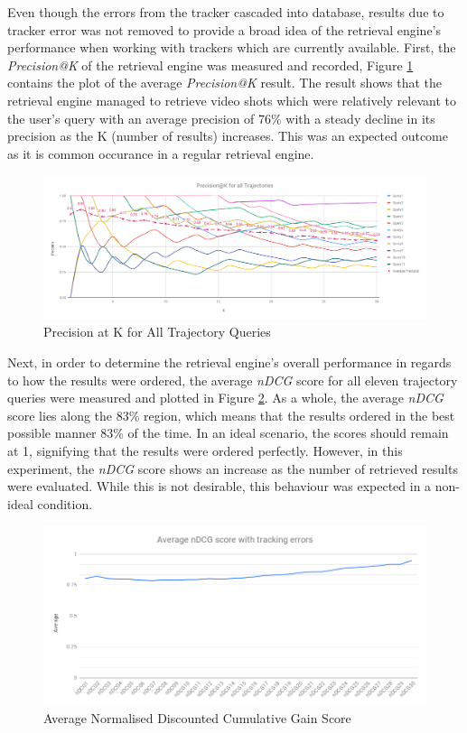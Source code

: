 Even though the errors from the tracker\cite{lim2017} cascaded into database,
results due to tracker error was not removed to provide a broad idea of the
retrieval engine's performance when working with trackers which are currently
available. First, the \textit{Precision@K} of the retrieval engine was measured
and recorded, Figure \ref{fig:versionTwoPreAtK} contains the plot of the
average \textit{Precision@K} result. The result shows that the retrieval engine
managed to retrieve video shots which were relatively relevant to the user's
query with an average precision of 76\% with a steady decline in its precision
as the K (number of results) increases. This was an expected outcome as it is
common occurance in a regular retrieval engine.

\begin{figure}[!ht]
  \centering
    \includegraphics[width=\linewidth]{image/retrievalTwo/p@k.png}
  \caption{Precision at K for All Trajectory Queries}
  \label{fig:versionTwoPreAtK}
\end{figure}

Next, in order to determine the retrieval engine's overall performance in
regards to how the results were ordered, the average \textit{nDCG} score for
all eleven trajectory queries were measured and plotted in Figure
\ref{fig:ndcgWithError}. As a whole, the average \textit{nDCG} score lies along
the 83\% region, which means that the results ordered in the best possible
manner 83\% of the time.
In an ideal scenario, the scores should remain at 1, signifying that the
results were ordered perfectly. However, in this experiment, the \textit{nDCG}
score shows an increase as the number of retrieved results were evaluated.
While this is not desirable, this behaviour was expected in a non-ideal
condition.

\begin{figure}[!ht]
  \centering
    \includegraphics[width=0.9\linewidth]{image/retrievalTwo/averageNDCG.png}
  \caption{Average Normalised Discounted Cumulative Gain Score}
  \label{fig:ndcgWithError}
\end{figure}

